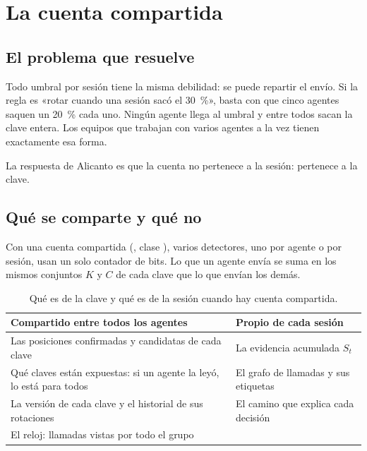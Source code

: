 \section{La cuenta compartida}\label{sec:compartida}

\subsection{El problema que resuelve}

Todo umbral por sesión tiene la misma debilidad: se puede repartir el envío. Si la regla es «rotar
cuando una sesión sacó el \qty{30}{\percent}», basta con que cinco agentes saquen un
\qty{20}{\percent} cada uno. Ningún agente llega al umbral y entre todos sacan la clave entera. Los
equipos que trabajan con varios agentes a la vez tienen exactamente esa forma.

La respuesta de Alicanto es que la cuenta no pertenece a la sesión: pertenece a la clave.

\subsection{Qué se comparte y qué no}

Con una cuenta compartida (, clase ), varios
detectores, uno por agente o por sesión, usan un solo contador de bits. Lo que un agente envía se suma
en los mismos conjuntos $K$ y $C$ de cada clave que lo que envían los demás.

\begin{table}[ht]
\caption{Qué es de la clave y qué es de la sesión cuando hay cuenta compartida.}\label{tab:compartido}
\small
\begin{tabularx}{\textwidth}{@{}LL@{}}
\toprule
Compartido entre todos los agentes & Propio de cada sesión \\
\midrule
Las posiciones confirmadas y candidatas de cada clave & La evidencia acumulada $S_t$ \\
Qué claves están expuestas: si un agente la leyó, lo está para todos & El grafo de llamadas y sus
  etiquetas \\
La versión de cada clave y el historial de sus rotaciones & El camino que explica cada decisión \\
El reloj: llamadas vistas por todo el grupo & \\
\bottomrule
\end{tabularx}
\end{table}

